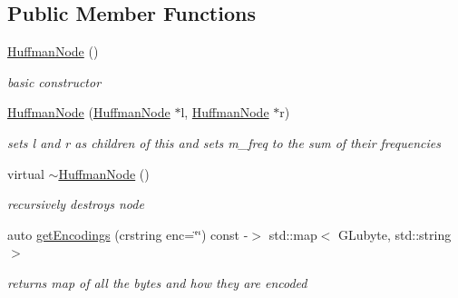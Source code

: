 \subsection*{Public Member Functions}
\begin{DoxyCompactItemize}
\item 
\mbox{\label{classnta_1_1HuffmanNode_a6e92a7ee38fd56994c2eb2d894d3d108}} 
\hyperlink{classnta_1_1HuffmanNode_a6e92a7ee38fd56994c2eb2d894d3d108}{Huffman\+Node} ()
\begin{DoxyCompactList}\small\item\em basic constructor \end{DoxyCompactList}\item 
\mbox{\label{classnta_1_1HuffmanNode_ae9aa27c2ed1cd215e3fe6a5fc48a0527}} 
\hyperlink{classnta_1_1HuffmanNode_ae9aa27c2ed1cd215e3fe6a5fc48a0527}{Huffman\+Node} (\hyperlink{classnta_1_1HuffmanNode}{Huffman\+Node} $\ast$l, \hyperlink{classnta_1_1HuffmanNode}{Huffman\+Node} $\ast$r)
\begin{DoxyCompactList}\small\item\em sets l and r as children of this and sets m\+\_\+freq to the sum of their frequencies \end{DoxyCompactList}\item 
\mbox{\label{classnta_1_1HuffmanNode_a45afade3ee4a50baba8daa66edd32e72}} 
virtual \hyperlink{classnta_1_1HuffmanNode_a45afade3ee4a50baba8daa66edd32e72}{$\sim$\+Huffman\+Node} ()
\begin{DoxyCompactList}\small\item\em recursively destroys node \end{DoxyCompactList}\item 
\mbox{\label{classnta_1_1HuffmanNode_abbdee24e11a5a72a54f6187228f9b7f0}} 
auto \hyperlink{classnta_1_1HuffmanNode_abbdee24e11a5a72a54f6187228f9b7f0}{get\+Encodings} (crstring enc=\char`\"{}\char`\"{}) const -\/$>$ std\+::map$<$ G\+Lubyte, std\+::string $>$
\begin{DoxyCompactList}\small\item\em returns map of all the bytes and how they are encoded \end{DoxyCompactList}\item 
\mbox{\label{classnta_1_1HuffmanNode_a2f67fd062ac5079cd40a0a82352d5a45}} 

\end{DoxyCompactItemize}
